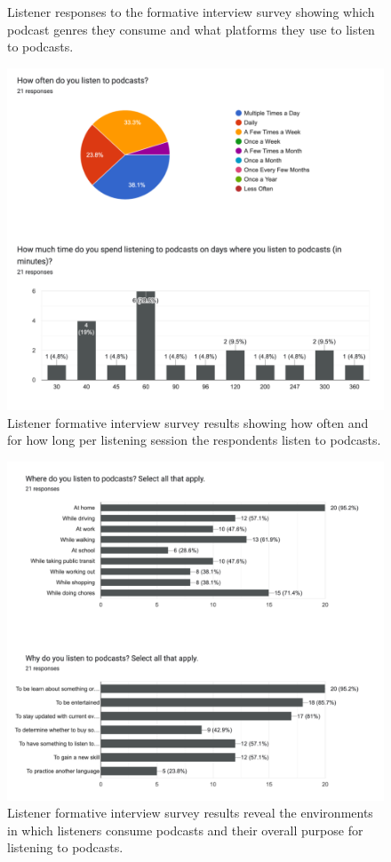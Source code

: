 \documentclass[12pt]{report}
\begin{document}
\begin{myfont}
\begin{figure}[H]
          \caption{Listener responses to the formative interview survey showing which podcast genres they consume and what platforms they use to listen to podcasts.}
        \end{figure}
        \begin{figure}[H]
        \centering
          \includegraphics[width=1\textwidth]{figures/formative6.png}
          \caption{Listener formative interview survey results showing how often and for how long per listening session the respondents listen to podcasts.}
        \end{figure}
        \begin{figure}[H]
        \centering
          \includegraphics[width=1\textwidth]{figures/formative7.png}
          \caption{Listener formative interview survey results reveal the environments in which listeners consume podcasts and their overall purpose for listening to podcasts.}
        \end{figure}
        

\end{myfont}
\end{document}
